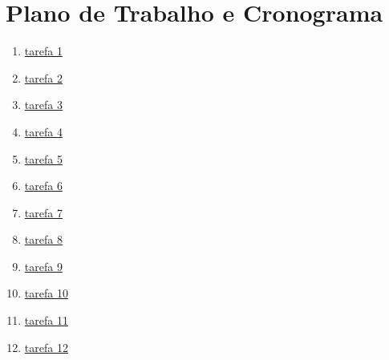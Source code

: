 \pagestyle{fancy}

\chapter{Plano de Trabalho e Cronograma}\label{cap6}

\begin{enumerate}

\item \hypertarget{txtask1}{\hyperlink{task1}{tarefa 1}}
\item \hypertarget{txtask2}{\hyperlink{task2}{tarefa 2}}
\item \hypertarget{txtask3}{\hyperlink{task3}{tarefa 3}}
\item \hypertarget{txtask4}{\hyperlink{task4}{tarefa 4}}
\item \hypertarget{txtask5}{\hyperlink{task5}{tarefa 5}}
\item \hypertarget{txtask6}{\hyperlink{task6}{tarefa 6}}
\item \hypertarget{txtask7}{\hyperlink{task7}{tarefa 7}}
\item \hypertarget{txtask8}{\hyperlink{task8}{tarefa 8}}
\item \hypertarget{txtask9}{\hyperlink{task9}{tarefa 9}}
\item \hypertarget{txtask10}{\hyperlink{task10}{tarefa 10}}
\item \hypertarget{txtask11}{\hyperlink{task11}{tarefa 11}}
\item \hypertarget{txtask12}{\hyperlink{task12}{tarefa 12}}

\end{enumerate}


